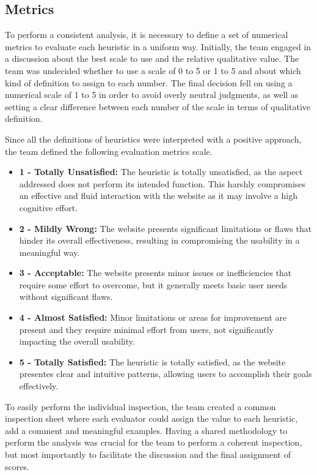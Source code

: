 
\subsection{Metrics}

To perform a consistent analysis, it is necessary to define a set of numerical metrics to evaluate each heuristic in a uniform way.
Initially, the team engaged in a discussion about the best scale to use and the relative qualitative value. The team was undecided whether to use a scale of 0 to 5 or 1 to 5 and about which kind of definition to assign to each number.
The final decision fell on using a numerical scale of 1 to 5 in order to avoid overly neutral judgments, as well as setting a clear difference between each number of the scale in terms of qualitative definition. 

Since all the definitions of heuristics were interpreted with a positive approach, the team defined the following evaluation metrics scale.
\begin{itemize}
    \item \textbf{1 - Totally Unsatisfied:} The heuristic is totally unsatisfied, as the aspect addressed does not perform its intended function. This harshly compromises an effective and fluid interaction with the website as it may involve a high cognitive effort.
    \item \textbf{2 - Mildly Wrong:} The website presents significant limitations or flaws that hinder its overall effectiveness, resulting in compromising the usability in a meaningful way.
    \item \textbf{3 - Acceptable:} The website presents minor issues or inefficiencies that require some effort to overcome, but it generally meets basic user needs without significant flaws.
    \item \textbf{4 - Almost Satisfied:} Minor limitations or areas for improvement are present and they require minimal effort from users, not significantly impacting the overall usability.
    \item \textbf{5 - Totally Satisfied:} The heuristic is totally satisfied, as the website presentes clear and intuitive patterns, allowing users to accomplish their goals effectively.
\end{itemize}

To easily perform the individual inspection, the team created a common inspection sheet where each evaluator could assign the value to each heuristic, add a comment and meaningful examples. Having a shared methodology to perform the analysis was crucial for the team to perform a coherent inspection, but most importantly to facilitate the discussion and the final assignment of scores.